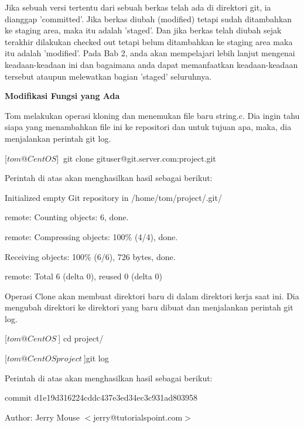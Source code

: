 Jika sebuah versi tertentu dari sebuah berkas telah ada di direktori 
git, ia dianggap 'committed'. Jika berkas diubah (modified) tetapi sudah 
ditambahkan ke staging area, maka itu adalah 'staged'. Dan jika berkas 
telah diubah sejak terakhir dilakukan checked out tetapi belum 
ditambahkan ke staging area maka itu adalah 'modified'. Pada Bab 2, anda 
akan mempelajari lebih lanjut mengenai keadaan-keadaan ini dan bagaimana 
anda dapat memanfaatkan keadaan-keadaan tersebut ataupun melewatkan 
bagian 'staged' seluruhnya.\vspace{12pt}

\textbf{Modifikasi Fungsi yang Ada}\vspace{12pt}

Tom melakukan operasi kloning dan menemukan file baru string.c. Dia 
ingin tahu siapa yang menambahkan file ini ke repositori dan untuk 
tujuan apa, maka, dia menjalankan perintah git log.\vspace{12pt}

[$tom@CentOS ]~$ git clone gituser@git.server.com:project.git\vspace{12pt}

Perintah di atas akan menghasilkan hasil sebagai berikut:\vspace{12pt}

Initialized empty Git repository in /home/tom/project/.git/

remote: Counting objects: 6, done.

remote: Compressing objects: 100\% (4/4), done.

Receiving objects: 100\% (6/6), 726 bytes, done.

remote: Total 6 (delta 0), reused 0 (delta 0)\vspace{12pt}

Operasi Clone akan membuat direktori baru di dalam direktori kerja saat 
ini. Dia mengubah direktori ke direktori yang baru dibuat dan 
menjalankan perintah git log.\vspace{12pt}

[$tom@CentOS ~$] cd project/

[$tom@CentOS project ~$]git log\vspace{12pt}

Perintah di atas akan menghasilkan hasil sebagai berikut:\vspace{12pt}

commit d1e19d316224cddc437e3ed34ec3c931ad803958

Author: Jerry Mouse $<$jerry@tutorialspoint.com$>$

